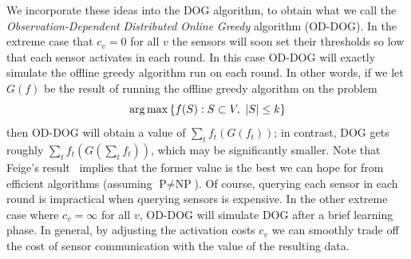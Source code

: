 \documentclass{sig-alternate-dan}
\numberwithin{equation}{section}
\newcommand{\algofont}[1]{\textsc{#1}}
\newcommand{\algoname}{{\algofont{DOG}}\xspace}
\newcommand{\gout}{\ensuremath{G}}
\newcommand{\estimate}[1]{\bar{#1}}
\newcommand{\boost}{\ensuremath{\lambda}}
\newcommand{\actcost}{\ensuremath{c}}
\newcommand{\oddog}{\algofont{OD-DOG}\xspace}
\newcommand{\dog}{\algofont{DOG}\xspace}
\newcommand{\sensor}{\ensuremath{v}}
\newcommand{\sensors}{V}
\newcommand{\obj}{\ensuremath{f}} %
\newcommand{\K}{\ensuremath{k}}
\newcommand{\payoff}{\ensuremath{\pi}}
\newcommand{\LimitProtocolShort}[0]{PMS Protocol\xspace}
\newcommand{\ignore}[1]{}
\newcommand{\class} [1] {\textrm{#1}} %
\renewcommand{\P} {\class{P}}
\newcommand{\NP} {\class{NP}}
\def \argmax {\mathop{\rm arg\,max}}
\newcommand{\set}[1]{\ensuremath{\left\{#1\right\}}}
\begin{document}
We incorporate these ideas into the \algoname algorithm, to obtain
what we call the \emph{Observation-Dependent}
\emph{Distributed Online} \emph{Greedy} algorithm (\oddog).
%
In the extreme case that $\actcost_{\sensor} = 0$ for all
$\sensor$ the sensors will soon set their thresholds so low that each sensor activates in
each round.  In this case \oddog will exactly simulate the offline
greedy algorithm run on each round.
In other words, if we let $\gout(f)$ be the result of running the  offline greedy
algorithm on the problem 
\[\argmax\set{f(S) : S \subset \sensors,\ |S| \le \K}\] 
%
%
then \oddog will obtain a value of $\sum_t
\obj_t(\gout(\obj_t))$;  in contrast, \dog gets roughly 
$\sum_t \obj_t(\gout(\sum_t \obj_t))$, which may be significantly smaller.
Note that Feige's result~\cite{feige97} implies that the former value is the
best we can hope for from efficient algorithms (assuming $\P \neq
\NP$).
Of course, querying each sensor in each round 
is impractical when querying sensors is
expensive.  In the other extreme case where $\actcost_{\sensor} = \infty$ for all
$\sensor$, \oddog will simulate \dog after a brief learning phase.
In general, by adjusting the activation costs $\actcost_{\sensor}$
we can smoothly trade off the cost of sensor communication with the value of the resulting data.


%



%
\ignore{
That is, it obtains a total value of almost
$\obj_{\Sigma}(\gout(\obj_{\Sigma}))$, where 
$\gout(f)$ is the result of running the simple offline greedy
algorithm on the problem 
\[\argmax_{ S \subset \sensors,\ |S| \le \K}\set{f(S)}\mbox{.}\] 
Ideally, we might hope to do better by using more communication and
exploiting local sensing in the algorithm.

Feige's result~\cite{feige97} implies that the best we can hope for from
efficient algorithms (assuming $\P \neq \NP$) 
is to do as well as the offline greedy algorithm
run on each round, i.e., $\sum_t \obj_t(\gout(\obj_t))$.
With unlimited communication and an value oracle for each $\obj_t$, we
can indeed obtain this much value simply by querying every sensor and then running the
offline greedy algorithm in each round.  
}
%
\ignore{
We suppose that on each round $t$ every sensor $\sensor$ takes a reading of its
environment and uses it to compute, 
for each MAB instance $I$ it participates in, an estimate of its
payoff $\estimate{\payoff} = \estimate{\payoff}(\sensor,t,I)$ if it is selected.  
Then when running the \LimitProtocolShort with lazy renormalization for
instance $I$, $\sensor$ boosts its activation probability by a
multiplicative factor of $\boost_{\sensor, I}(\estimate{\payoff})$, 
where $\boost_{\sensor, I}:[0,1] \to [1, \infty)$ is a function
that $\sensor$ learns to optimize its contribution to the overall solution.
}
\end{document}
